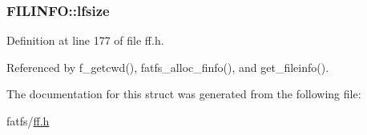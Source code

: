 \subsubsection[{\texorpdfstring{lfsize}{lfsize}}]{ F\+I\+L\+I\+N\+F\+O\+::lfsize}\hypertarget{structFILINFO_a2527c511ff4d12d285dbf3c4b3c9fb7b}{}\label{structFILINFO_a2527c511ff4d12d285dbf3c4b3c9fb7b}


Definition at line 177 of file ff.\+h.



Referenced by f\+\_\+getcwd(), fatfs\+\_\+alloc\+\_\+finfo(), and get\+\_\+fileinfo().



The documentation for this struct was generated from the following file\+:\begin{DoxyCompactItemize}
\item 
fatfs/\hyperlink{ff_8h}{ff.\+h}\end{DoxyCompactItemize}
